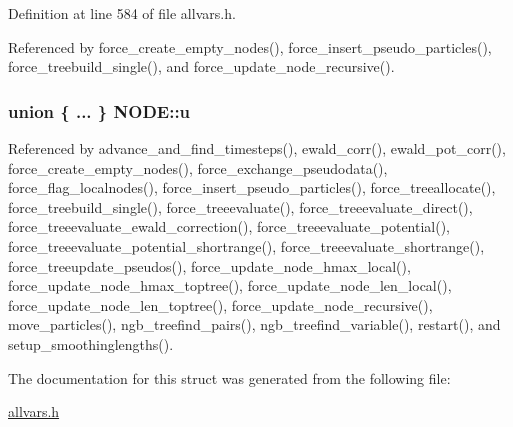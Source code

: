 Definition at line 584 of file allvars.h.



Referenced by force\_\-create\_\-empty\_\-nodes(), force\_\-insert\_\-pseudo\_\-particles(), force\_\-treebuild\_\-single(), and force\_\-update\_\-node\_\-recursive().

\hypertarget{structNODE_acd7e6747d70c2205a6fb3d44b6465dd4}{
\subsubsection[{u}]{\setlength{\rightskip}{0pt plus 5cm}union \{ ... \} 
   {\bf NODE::u}}}
\label{structNODE_acd7e6747d70c2205a6fb3d44b6465dd4}


Referenced by advance\_\-and\_\-find\_\-timesteps(), ewald\_\-corr(), ewald\_\-pot\_\-corr(), force\_\-create\_\-empty\_\-nodes(), force\_\-exchange\_\-pseudodata(), force\_\-flag\_\-localnodes(), force\_\-insert\_\-pseudo\_\-particles(), force\_\-treeallocate(), force\_\-treebuild\_\-single(), force\_\-treeevaluate(), force\_\-treeevaluate\_\-direct(), force\_\-treeevaluate\_\-ewald\_\-correction(), force\_\-treeevaluate\_\-potential(), force\_\-treeevaluate\_\-potential\_\-shortrange(), force\_\-treeevaluate\_\-shortrange(), force\_\-treeupdate\_\-pseudos(), force\_\-update\_\-node\_\-hmax\_\-local(), force\_\-update\_\-node\_\-hmax\_\-toptree(), force\_\-update\_\-node\_\-len\_\-local(), force\_\-update\_\-node\_\-len\_\-toptree(), force\_\-update\_\-node\_\-recursive(), move\_\-particles(), ngb\_\-treefind\_\-pairs(), ngb\_\-treefind\_\-variable(), restart(), and setup\_\-smoothinglengths().



The documentation for this struct was generated from the following file:\begin{DoxyCompactItemize}
\item 
\hyperlink{allvars_8h}{allvars.h}\end{DoxyCompactItemize}
